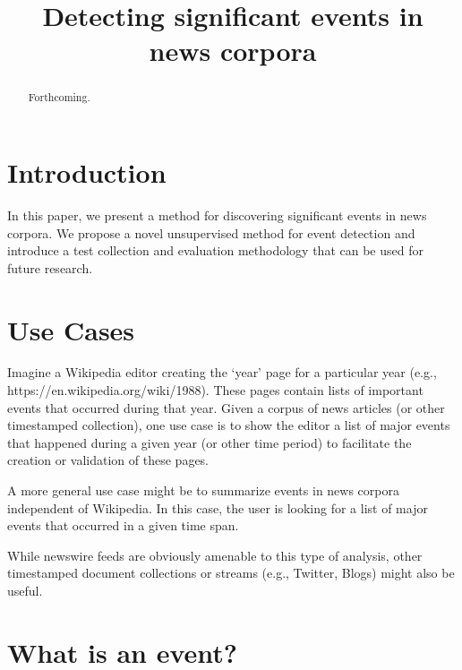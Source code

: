 \documentclass{sig-alternate}
\begin{document}
%

\title{Detecting significant events in news corpora}

\maketitle
\begin{abstract}
Forthcoming.
\end{abstract}


\terms{}


\section{Introduction}

In this paper, we present a method for discovering significant events in news corpora. We propose a novel unsupervised method for event detection
and introduce a test collection and evaluation methodology that can be used for future research.

\section{Use Cases}

Imagine a Wikipedia editor creating the `year' page for a particular year (e.g., https://en.wikipedia.org/wiki/1988). These pages contain lists of important events that occurred during that year. Given a corpus of news articles (or other timestamped collection), one use case is to show the editor a list of major events that happened during a given year  (or other time period) to facilitate the creation or validation of these pages.

A more general use case might be to summarize events in news corpora independent of Wikipedia. In this case, the user is looking for a list of major events that occurred in a given time span. 

While newswire feeds are obviously amenable to this type of analysis, other timestamped document collections or streams (e.g., Twitter, Blogs) might also be useful.

\section{What is an event?}
\end{document}

